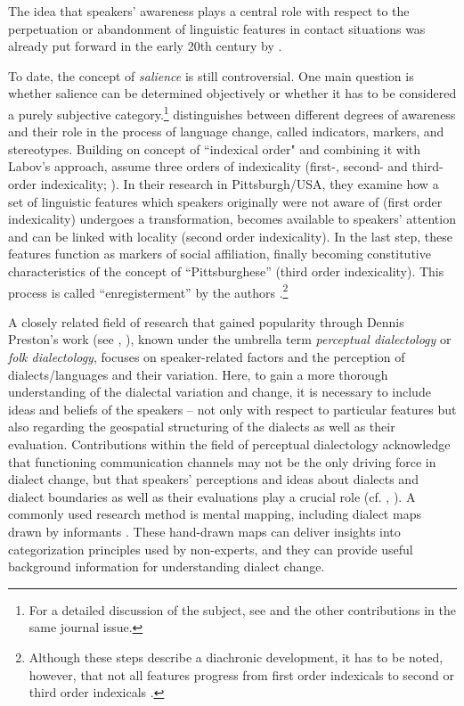 \documentclass[output=paper]{langscibook}
\begin{document}
The idea that speakers’ awareness plays a central role with respect to the perpetuation or abandonment of linguistic features in contact situations was already put forward in the early 20th century by \citet{Shirmunski1928}.

To date, the concept of \textit{salience} is still controversial. One main question is whether salience can be determined objectively or whether it has to be considered a purely subjective category.\footnote{For a detailed discussion of the subject, see \textcite{Christen2014} and the other contributions in the same journal issue.} \textcite{Labov1972a} distinguishes between different degrees of awareness and their role in the process of language change, called indicators, markers, and stereotypes.
Building on  concept of “indexical order" and combining it with Labov's approach, \citet{Johnstone2006} assume three orders of indexicality (first-, second- and third-order indexicality; \citealt[cf.][82]{Johnstone2006}). 
In their research in Pittsburgh/USA, they examine how a set of linguistic features which speakers originally were not aware of (first order indexicality) undergoes a transformation, becomes available to speakers' attention and can be linked with locality (second order indexicality). In the last step, these features function as markers of social affiliation, finally becoming constitutive characteristics of the concept of “Pittsburghese” (third order indexicality). This process is called “enregisterment” by the authors \parencite[77]{Johnstone2006}.\footnote{Although these steps describe a diachronic development, it has to be noted, however, that not all features progress from first order indexicals to second or third order indexicals \citep[14]{Auer2013}.}

A closely related field of research that gained popularity through Dennis Preston’s work (see \cite{Preston1989}, \citeyear{Preston2005}), known under the umbrella term \textit{perceptual dialectology} or \textit{folk dialectology}, focuses on speaker-related factors and the perception of dialects/languages and their variation. Here, to gain a more thorough understanding of the dialectal variation and change, it is necessary to include ideas and beliefs of the speakers -- not only with respect to particular features but also regarding the geospatial structuring of the dialects as well as their evaluation. Contributions within the field of perceptual dialectology acknowledge that functioning communication channels may not be the only driving force in dialect change, but that speakers' perceptions and ideas about dialects and dialect boundaries as well as their evaluations play a crucial role (cf. \cite[][160--161]{Auer2004}, \cite[172]{Kristiansen2009}).
A commonly used research method is mental mapping, including dialect maps drawn by informants \parencite[for an account of the methodology and its application, see][]{Montgomery2013}. These hand-drawn maps can deliver insights into categorization principles used by non-experts, and they can provide useful background information for understanding dialect change. 
\end{document}
